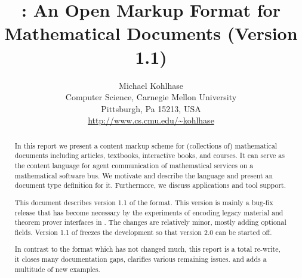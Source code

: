 \documentclass[11pt,twoside,titlepage]{report}
\title{{\omdoc}: An Open Markup Format for Mathematical Documents (Version 1.1)}
\author{Michael Kohlhase\\
  Computer Science, Carnegie Mellon University\\
  Pittsburgh, Pa 15213, USA\\
  {\url{http://www.cs.cmu.edu/~kohlhase}}}
\begin{document}
\maketitle
\setcounter{page}{0}
\begin{abstract}
  In this report we present a content markup scheme for (collections of)
  mathematical documents including articles, textbooks, interactive books, and
  courses. It can serve as the content language for agent communication of
  mathematical services on a mathematical software bus. We motivate and describe
  the {\omdoc} language and present an {\xml} document type definition for it.
  Furthermore, we discuss applications and tool support.
  
  This document describes version 1.1 of the {\omdoc} format. This version is
  mainly a bug-fix release that has become necessary by the experiments of
  encoding legacy material and theorem prover interfaces in {\omdoc}.  The changes
  are relatively minor, mostly adding optional fields. Version 1.1 of {\omdoc}
  freezes the development so that version 2.0 can be started off.
  
  In contrast to the {\omdoc} format which has not changed much, this report is a
  total re-write, it closes many documentation gaps, clarifies various remaining
  issues. and adds a multitude of new examples.
\end{abstract}
\newpage
\setcounter{tocdepth}{2}\tableofcontents
\newpage{}




%

\newpage 
 
 
\newpage
{\small}

\ednotemessage
\end{document}

